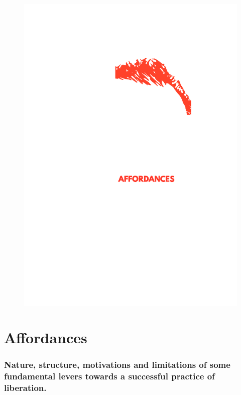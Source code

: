 \begin{figure}[htbp]
\centering
\includegraphics{../../images/cost-of-freedom-affordances.jpg}
\caption{}
\end{figure}

\section{Affordances}\label{affordances}

\subsubsection{Nature, structure, motivations and limitations of some
fundamental levers towards a successful practice of
liberation.}\label{nature-structure-motivations-and-limitations-of-some-fundamental-levers-towards-a-successful-practice-of-liberation.}

